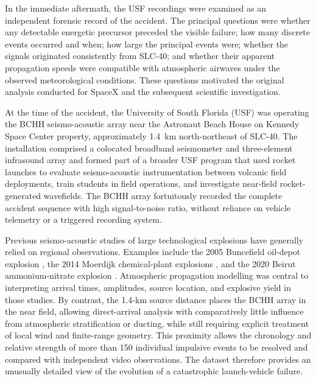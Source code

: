 \documentclass[]{seismica}
\begin{document}
In the immediate aftermath, the USF recordings were examined as an independent
forensic record of the accident. The principal questions were whether any
detectable energetic precursor preceded the visible failure; how many discrete
events occurred and when; how large the principal events were; whether the
signals originated consistently from SLC-40; and whether their apparent
propagation speeds were compatible with atmospheric airwaves under the observed
meteorological conditions. These questions motivated the original analysis
conducted for SpaceX and the subsequent scientific investigation.

At the time of the accident, the University of South Florida (USF) was
operating the BCHH seismo-acoustic array near the Astronaut Beach House on
Kennedy Space Center property, approximately 1.4~km north-northeast of SLC-40.
The installation comprised a colocated broadband seismometer and three-element
infrasound array and formed part of a broader USF program that used rocket
launches to evaluate seismo-acoustic instrumentation between volcanic field
deployments, train students in field operations, and investigate near-field
rocket-generated wavefields. The BCHH array fortuitously recorded the complete
accident sequence with high signal-to-noise ratio, without reliance on vehicle
telemetry or a triggered recording system.

Previous seismo-acoustic studies of large technological explosions have
generally relied on regional observations. Examples include the 2005 Buncefield
oil-depot explosion \citep{ottemoller_2008,ceranna_2009,green_2008}, the 2014
Moerdijk chemical-plant explosions \citep{smink_2019}, and the 2020 Beirut
ammonium-nitrate explosion \citep{pilger_beirut_2021,kim_pasyanos_2022}.
Atmospheric propagation modelling was central to interpreting arrival times,
amplitudes, source location, and explosive yield in those studies. By contrast,
the 1.4-km source distance places the BCHH array in the near field, allowing
direct-arrival analysis with comparatively little influence from atmospheric
stratification or ducting, while still requiring explicit treatment of local
wind and finite-range geometry. This proximity allows the chronology and
relative strength of more than 150 individual impulsive events to be resolved
and compared with independent video observations. The dataset therefore
provides an unusually detailed view of the evolution of a catastrophic
launch-vehicle failure.
\end{document}
